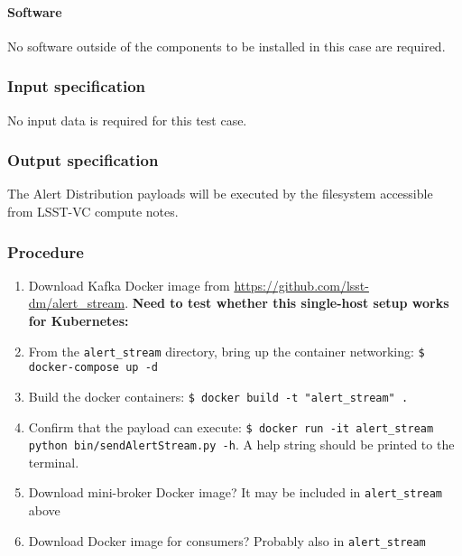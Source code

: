 \paragraph{Software}

No software outside of the components to be installed in this case are required.

\subsubsection{Input specification}

No input data is required for this test case.

\subsubsection{Output specification}

The Alert Distribution payloads will be executed by the 
filesystem accessible from LSST-VC compute notes.

\subsubsection{Procedure}

\begin{enumerate}


	\item{Download Kafka Docker image from \url{https://github.com/lsst-dm/alert\_stream}.}
\textbf{Need to test whether this single-host setup works for Kubernetes:}
	\item{From the \texttt{alert\_stream} directory, bring up the container networking: \texttt{\$ docker-compose up -d}}
	\item{Build the docker containers: \texttt{\$ docker build -t "alert\_stream" .}}
	\item{Confirm that the payload can execute: \texttt{\$ docker run -it alert\_stream python bin/sendAlertStream.py -h}.  A help string should be printed to the terminal.}


	\item{Download mini-broker Docker image?  It may be included in \texttt{alert\_stream} above}
	\item{Download Docker image for consumers?  Probably also in \texttt{alert\_stream}}

\end{enumerate}
